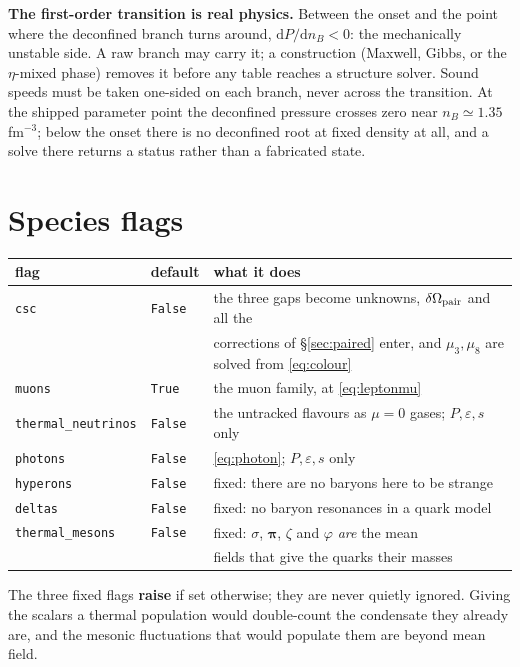 \documentclass[11pt,a4paper]{article}
\newcommand{\code}[1]{\texttt{#1}}
\begin{document}
\textbf{The first-order transition is real physics.} Between the onset and the
point where the deconfined branch turns around, $\mathrm dP/\mathrm dn_B<0$:
the mechanically unstable side. A raw branch may carry it; a construction
(Maxwell, Gibbs, or the $\eta$-mixed phase) removes it before any table reaches
a structure solver. Sound speeds must be taken one-sided on each branch, never
across the transition. At the shipped parameter point the deconfined pressure
crosses zero near $n_B\simeq1.35$ fm$^{-3}$; below the onset there is no
deconfined root at fixed density at all, and a solve there returns a status
rather than a fabricated state.

\section{Species flags}
\label{sec:flags}

\begin{center}
\begin{tabular}{lll}
\toprule
flag & default & what it does \\
\midrule
\code{csc} & \code{False}
 & the three gaps become unknowns, $\delta\Omega_{\rm pair}$ and all the \\
 & & corrections of \S\ref{sec:paired} enter, and $\mu_3,\mu_8$ are solved
 from \eqref{eq:colour} \\
\code{muons} & \code{True} & the muon family, at \eqref{eq:leptonmu} \\
\code{thermal\_neutrinos} & \code{False}
 & the untracked flavours as $\mu=0$ gases; $P,\varepsilon,s$ only \\
\code{photons} & \code{False} & \eqref{eq:photon}; $P,\varepsilon,s$ only \\
\midrule
\code{hyperons} & \code{False} & fixed: there are no baryons here to be strange \\
\code{deltas} & \code{False} & fixed: no baryon resonances in a quark model \\
\code{thermal\_mesons} & \code{False}
 & fixed: $\sigma$, $\bm\pi$, $\zeta$ and $\varphi$ \emph{are} the mean \\
 & & fields that give the quarks their masses \\
\bottomrule
\end{tabular}
\end{center}

The three fixed flags \textbf{raise} if set otherwise; they are never quietly
ignored. Giving the scalars a thermal population would double-count the
condensate they already are, and the mesonic fluctuations that would populate
them are beyond mean field.
\end{document}
